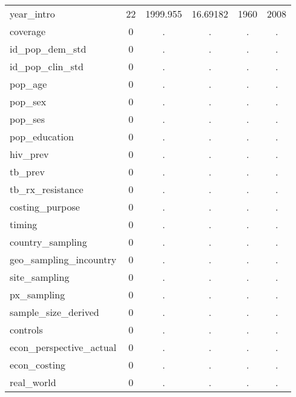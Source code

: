 \begin{table}[htbp]
\begin{tabular}{l*{1}{ccccc}}
year\_intro  &          22&    1999.955&    16.69182&        1960&        2008\\
coverage    &           0&           .&           .&           .&           .\\
id\_pop\_dem\_std&           0&           .&           .&           .&           .\\
id\_pop\_clin\_std&           0&           .&           .&           .&           .\\
pop\_age     &           0&           .&           .&           .&           .\\
pop\_sex     &           0&           .&           .&           .&           .\\
pop\_ses     &           0&           .&           .&           .&           .\\
pop\_education&           0&           .&           .&           .&           .\\
hiv\_prev    &           0&           .&           .&           .&           .\\
tb\_prev     &           0&           .&           .&           .&           .\\
tb\_rx\_resistance&           0&           .&           .&           .&           .\\
costing\_purpose&           0&           .&           .&           .&           .\\
timing      &           0&           .&           .&           .&           .\\
country\_sampling&           0&           .&           .&           .&           .\\
geo\_sampling\_incountry&           0&           .&           .&           .&           .\\
site\_sampling&           0&           .&           .&           .&           .\\
px\_sampling &           0&           .&           .&           .&           .\\
sample\_size\_derived&           0&           .&           .&           .&           .\\
controls    &           0&           .&           .&           .&           .\\
econ\_perspective\_actual&           0&           .&           .&           .&           .\\
econ\_costing&           0&           .&           .&           .&           .\\
real\_world  &           0&           .&           .&           .&           .\\

\end{tabular}
\end{table}
